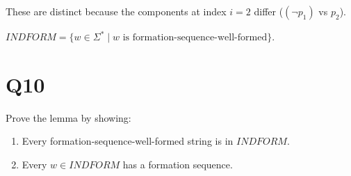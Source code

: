 \documentclass{article}
\newtheorem{lemma}[theorem]{Lemma}
\let\oldlemma\lemma
\let\endoldlemma\endlemma
\renewenvironment{lemma}
  {\begin{tcolorbox}[
      colback=green!8,
      colframe=green!50!black,
      boxrule=0.6pt,
      arc=2pt,
      left=6pt,right=6pt,top=4pt,bottom=4pt
    ]\oldlemma}
  {\endoldlemma\end{tcolorbox}}
\begin{document}
These are distinct because the components at index $i=2$ differ ($(\neg p_1)$ vs $p_2$).
\begin{lemma}
$INDFORM = \{ w \in \Sigma^* \mid w \text{ is formation-sequence-well-formed} \}$.
\end{lemma}

\section*{Q10}
Prove the lemma by showing:
\begin{enumerate}
    \item Every formation-sequence-well-formed string is in ${INDFORM}$.
    \item Every $w \in {INDFORM}$ has a formation sequence.
\end{enumerate}
\end{document}
